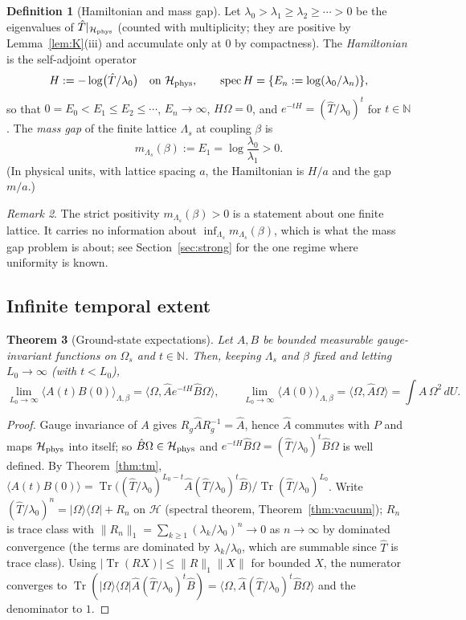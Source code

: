 \documentclass[11pt,a4paper]{article}
\newtheorem{theorem}{Theorem}[section]
\theoremstyle{definition}
\newtheorem{definition}[theorem]{Definition}
\theoremstyle{remark}
\newtheorem{remark}[theorem]{Remark}
\DeclareMathOperator{\Tr}{Tr}
\DeclareMathOperator{\spec}{spec}
\newcommand{\N}{\mathbb{N}}
\newcommand{\cH}{\mathcal{H}}
\newcommand{\hT}{\hat{T}}
\newcommand{\hA}{\hat{A}}
\newcommand{\hB}{\hat{B}}
\newcommand{\dU}{\,dU}
\newcommand{\ip}[2]{\langle #1,#2\rangle}
\newcommand{\norm}[1]{\lVert #1\rVert}
\begin{document}
\begin{definition}[Hamiltonian and mass gap]\label{def:H}
Let $\lambda_0>\lambda_1\ge\lambda_2\ge\cdots>0$ be the eigenvalues of $\hT|_{\cH_{\rm phys}}$ (counted with
multiplicity; they are positive by Lemma~\ref{lem:K}(iii) and accumulate only at $0$ by compactness). The
\emph{Hamiltonian} is the self-adjoint operator
\[
H:=-\log\bigl(\hT/\lambda_0\bigr)\quad\text{on }\cH_{\rm phys},\qquad \spec H=\{E_n:=\log(\lambda_0/\lambda_n)\},
\]
so that $0=E_0<E_1\le E_2\le\cdots$, $E_n\to\infty$, $H\Omega=0$, and $e^{-tH}=(\hT/\lambda_0)^t$ for $t\in\N$. The
\emph{mass gap} of the finite lattice $\Lambda_s$ at coupling $\beta$ is
\[
m_{\Lambda_s}(\beta):=E_1=\log\frac{\lambda_0}{\lambda_1}>0 .
\]
(In physical units, with lattice spacing $a$, the Hamiltonian is $H/a$ and the gap $m/a$.)
\end{definition}

\begin{remark}
The strict positivity $m_{\Lambda_s}(\beta)>0$ is a statement about one finite lattice. It carries no information
about $\inf_{\Lambda_s}m_{\Lambda_s}(\beta)$, which is what the mass gap problem is about; see
Section~\ref{sec:strong} for the one regime where uniformity is known.
\end{remark}

\subsection{Infinite temporal extent}

\begin{theorem}[Ground-state expectations]\label{thm:gs}
Let $A,B$ be bounded measurable gauge-invariant functions on $\Omega_s$ and $t\in\N$. Then, keeping $\Lambda_s$ and
$\beta$ fixed and letting $L_0\to\infty$ (with $t<L_0$),
\[
\lim_{L_0\to\infty}\langle A(t)B(0)\rangle_{\Lambda,\beta}=\ip\Omega{\hA e^{-tH}\hB\Omega},\qquad
\lim_{L_0\to\infty}\langle A(0)\rangle_{\Lambda,\beta}=\ip\Omega{\hA\Omega}=\int A\,\Omega^2\dU .
\]
\end{theorem}

\begin{proof}
Gauge invariance of $A$ gives $R_g\hA R_g^{-1}=\hA$, hence $\hA$ commutes with $P$ and maps $\cH_{\rm phys}$ into
itself; so $\hB\Omega\in\cH_{\rm phys}$ and $e^{-tH}\hB\Omega=(\hT/\lambda_0)^t\hB\Omega$ is well defined. By
Theorem~\ref{thm:tm},
$\langle A(t)B(0)\rangle=\Tr\bigl((\hT/\lambda_0)^{L_0-t}\hA(\hT/\lambda_0)^t\hB\bigr)/\Tr(\hT/\lambda_0)^{L_0}$.
Write $(\hT/\lambda_0)^n=|\Omega\rangle\langle\Omega|+R_n$ on $\cH$ (spectral theorem, Theorem~\ref{thm:vacuum});
$R_n$ is trace class with $\norm{R_n}_1=\sum_{k\ge1}(\lambda_k/\lambda_0)^n\to0$ as $n\to\infty$ by dominated
convergence (the terms are dominated by $\lambda_k/\lambda_0$, which are summable since $\hT$ is trace class).
Using $|\Tr(RX)|\le\norm R_1\norm X$ for bounded $X$, the numerator converges to
$\Tr(|\Omega\rangle\langle\Omega|\hA(\hT/\lambda_0)^t\hB)=\ip\Omega{\hA(\hT/\lambda_0)^t\hB\Omega}$ and the
denominator to $1$.
\end{proof}
\end{document}
